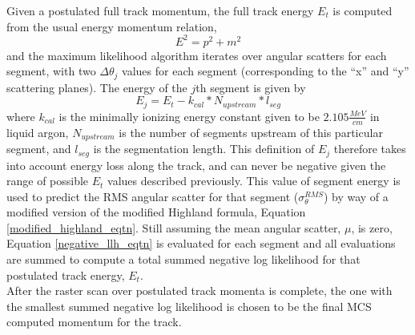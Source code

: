 Given a postulated full track momentum, the full track energy $E_t$ is computed from the usual energy momentum relation,
\begin{equation}\label{energy_momentum_relation_eqtn}
E^2 = p^2 + m^2
\end{equation}
 and the maximum likelihood algorithm iterates over angular scatters for each segment, with two $\Delta\theta_j$ values for each segment (corresponding to the ``x'' and ``y'' scattering planes). The energy of the $j$th segment is given by
\begin{equation}\label{segment_E_equation}
E_{j} = E_t - k_{cal}*N_{upstream}*l_{seg}
\end{equation}
where $k_{cal}$ is the minimally ionizing energy constant given to be $2.105 \frac{MeV}{cm}$ in liquid argon\cite{MIPenergysource}, $N_{upstream}$ is the number of segments upstream of this particular segment, and $l_{seg}$ is the segmentation length. This definition of $E_j$ therefore takes into account energy loss along the track, and can never be negative given the range of possible $E_t$ values described previously. This value of segment energy is used to predict the RMS angular scatter for that segment ($\sigma_\theta^{RMS}$) by way of a modified version of the modified Highland formula, Equation \ref{modified_highland_eqtn}. Still assuming the mean angular scatter, $\mu$, is zero, Equation \ref{negative_llh_eqtn} is evaluated for each segment and all evaluations are summed to compute a total summed negative log likelihood for that postulated track energy, $E_t$.\\

After the raster scan over postulated track momenta is complete, the one with the smallest summed negative log likelihood is chosen to be the final MCS computed momentum for the track.















